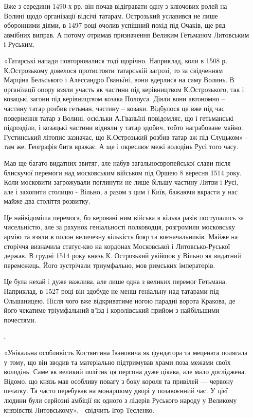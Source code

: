 Вже з середини 1490-х рр. він почав відігравати одну з ключових ролей на Волині
щодо організації відсічі татарам. Острозький уславився не лише оборонними
діями, в 1497 році очолив успішний похід під Очаків, ще ряд авмібних виправ. А
потому отримав призначення Великим Гетьманом Литовським і Руським.

«Татарські напади повторювалися тоді щорічно. Наприклад, коли в 1508 р.
К.Острозькому довелося протистояти татарській загрозі, то за свідченням Марціна
Бельського і Алессандро Гваньїні, вони вдерлися на саму Волинь. В організації
опору взяли участь як частини під керівництвом К.Острозького, так і козацькі
загони під керівництвом козака Полоуса. Діяли вони автономно – частину татар
розбив гетьман, частину – козаки. Відбулося це вже під час повернення татар з
Волині, оскільки А.Гваньїні повідомляє, що і гетьманські підрозділи, і козацькі
частини відняли у татар здобич, тобто награбоване майно. Густинський літопис
зазначає, що К.Острозький розбив татар аж під Слуцьком» - там же. Географія
битв вражає. А ще і окреслює межі володінь Русі того часу.

Мав ще багато видатних звитяг, але набув загальноєвропейської слави після
блискучої перемоги над московським військом під Оршею 8 вересня 1514 року. Коли
московити загрожували поглинути не лише більшу частину Литви і Русі, але і
захопити столицю - Вільно, а разом з цим і Київ, бажаючи вкрасти у нас майже
два століття розвитку. 

Це найвідоміша перемога, бо керовані ним війська в кілька разів поступались за
чисельністю, але за рахунок геніальності полководця, розгромили московську
армію та взяли в полон величезну кількість бояр та воєначальників. Майже на
сторіччя визначила статус-кво на кордонах Московської і Литовсько-Руської
держав. В грудні 1514 року князь К. Острозький увійшов у Вільно як видатний
переможець. Його зустрічали триумфально, мов римських імператорів. 

Це була нехай і дуже важлива, але лише одна з великих перемог Гетьмана.
Наприклад, в 1527 році він здобуде не менш геніальну над татарами під
Ольшаницею. Після чого вже відкриватиме ногою парадні ворота Кракова, де його
чекатиме тріумфальний в’їзд і королівський прийом з найбільшими почестями.

.

«Унікальна особливість Костянтина Івановича як фундатора та мецената полягала у
тому, що він зводив та матеріально підтримував храми поза межами своїх
володінь. Саме як великий політик ця персона дуже цікава, але мало досліджена.
Відомо, що князь  мав особливу повагу з боку короля та привілей — червону
печатку. Та часто перебував на монаршому дворі у позавоєнний час. У цієї людини
були серйозні амбіції як одного з лідерів Руського народу у Великому князівстві
Литовському», - свідчить Ігор Тесленко.

